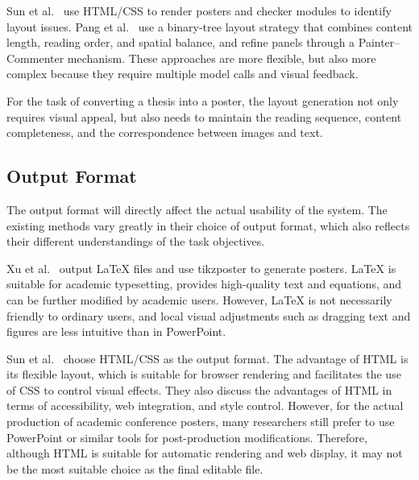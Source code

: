 \documentclass[12pt,oneside]{report}
\begin{document}
\vspace{1em}

Sun et al.~\cite{p2p} use HTML/CSS to render posters and checker modules to identify layout issues. Pang et al.~\cite{paper2poster} use a binary-tree layout strategy that combines content length, reading order, and spatial balance, and refine panels through a Painter--Commenter mechanism. These approaches are more flexible, but also more complex because they require multiple model calls and visual feedback.

\vspace{1em}

For the task of converting a thesis into a poster, the layout generation not only requires visual appeal, but also needs to maintain the reading sequence, content completeness, and the correspondence between images and text.

\subsection{Output Format}

The output format will directly affect the actual usability of the system. The existing methods vary greatly in their choice of output format, which also reflects their different understandings of the task objectives.

\vspace{1em}

Xu et al.~\cite{posterbot} output LaTeX files and use tikzposter to generate posters. LaTeX is suitable for academic typesetting, provides high-quality text and equations, and can be further modified by academic users. However, LaTeX is not necessarily friendly to ordinary users, and local visual adjustments such as dragging text and figures are less intuitive than in PowerPoint.

\vspace{1em}

Sun et al.~\cite{p2p} choose HTML/CSS as the output format. The advantage of HTML is its flexible layout, which is suitable for browser rendering and facilitates the use of CSS to control visual effects. They also discuss the advantages of HTML in terms of accessibility, web integration, and style control. However, for the actual production of academic conference posters, many researchers still prefer to use PowerPoint or similar tools for post-production modifications. Therefore, although HTML is suitable for automatic rendering and web display, it may not be the most suitable choice as the final editable file.
\end{document}
